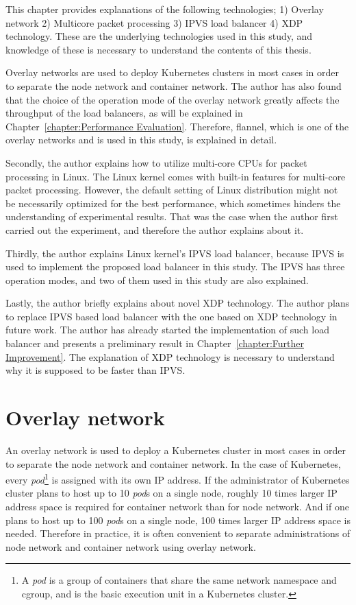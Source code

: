 

  This chapter provides explanations of the following technologies;
  1) Overlay network
  2) Multicore packet processing
  3) IPVS load balancer
  4) XDP technology.
  These are the underlying technologies used in this study, and knowledge of these is necessary to understand the contents of this thesis.





Overlay networks are used to deploy Kubernetes clusters in most cases in order to separate the node network and container network.
The author has also found that the choice of the operation mode of the overlay network greatly affects the throughput of the load balancers, as will be explained in Chapter~\ref{chapter:Performance Evaluation}.
Therefore, flannel, which is one of the overlay networks and is used in this study, is explained in detail.

Secondly, the author explains how to utilize multi-core CPUs for packet processing in Linux.
The Linux kernel comes with built-in features for multi-core packet processing.
However, the default setting of Linux distribution might not be necessarily optimized for the best performance, which sometimes hinders the understanding of experimental results.
That was the case when the author first carried out the experiment, and therefore the author explains about it.

Thirdly, the author explains Linux kernel's IPVS load balancer, because IPVS is used to implement the proposed load balancer in this study.
The IPVS has three operation modes, and two of them used in this study are also explained.

Lastly, the author briefly explains about novel XDP technology.
The author plans to replace IPVS based load balancer with the one based on XDP technology in future work.
The author has already started the implementation of such load balancer and presents a preliminary result in Chapter~\ref{chapter:Further Improvement}.
The explanation of XDP technology is necessary to understand why it is supposed to be faster than IPVS.


\section{Overlay network}


  An overlay network is used to deploy a Kubernetes cluster in most cases in order to separate the node network and container network.
  In the case of Kubernetes, every {\em pod}\footnote{A {\em pod} is a group of containers that share the same network namespace and cgroup, and is the basic execution unit in a Kubernetes cluster.} is assigned with its own IP address.
  If the administrator of Kubernetes cluster plans to host up to 10 {\em pod}s on a single node, roughly 10 times larger IP address space is required for container network than for node network.
  And if one plans to host up to 100 {\em pod}s on a single node, 100 times larger IP address space is needed.
  Therefore in practice, it is often convenient to separate administrations of node network and container network using overlay network.


